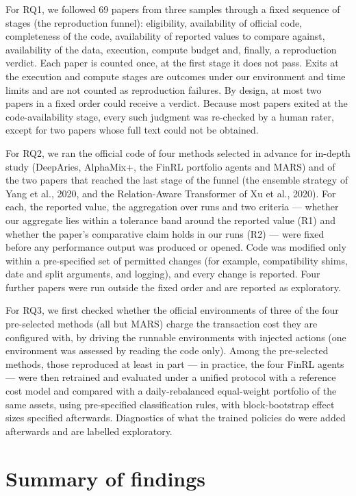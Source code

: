 \documentclass[12pt,a4paper]{report}
\begin{document}
For RQ1, we followed 69 papers from three samples through a fixed
sequence of stages (the reproduction funnel): eligibility, availability
of official code, completeness of the code, availability of reported
values to compare against, availability of the data, execution, compute
budget and, finally, a reproduction verdict. Each paper is counted once,
at the first stage it does not pass. Exits at the execution and compute
stages are outcomes under our environment and time limits and are not
counted as reproduction failures. By design, at most two papers in a
fixed order could receive a verdict. Because most papers exited at the
code-availability stage, every such judgment was re-checked by a human
rater, except for two papers whose full text could not be obtained.

For RQ2, we ran the official code of four methods selected in advance
for in-depth study (DeepAries, AlphaMix+, the FinRL portfolio agents and
MARS) and of the two papers that reached the last stage of the funnel
(the ensemble strategy of Yang et al., 2020, and the Relation-Aware
Transformer of Xu et al., 2020). For each, the reported value, the
aggregation over runs and two criteria --- whether our aggregate lies
within a tolerance band around the reported value (R1) and whether the
paper's comparative claim holds in our runs (R2) --- were fixed before
any performance output was produced or opened. Code was modified only
within a pre-specified set of permitted changes (for example,
compatibility shims, date and split arguments, and logging), and every
change is reported. Four further papers were run outside the fixed order
and are reported as exploratory.

For RQ3, we first checked whether the official environments of three of
the four pre-selected methods (all but MARS) charge the transaction cost
they are configured with, by driving the runnable environments with
injected actions (one environment was assessed by reading the code
only). Among the pre-selected methods, those reproduced at least in part
--- in practice, the four FinRL agents --- were then retrained and
evaluated under a unified protocol with a reference cost model and
compared with a daily-rebalanced equal-weight portfolio of the same
assets, using pre-specified classification rules, with block-bootstrap
effect sizes specified afterwards. Diagnostics of what the trained
policies do were added afterwards and are labelled exploratory.

\section{Summary of findings}\label{summary-of-findings}
\end{document}

